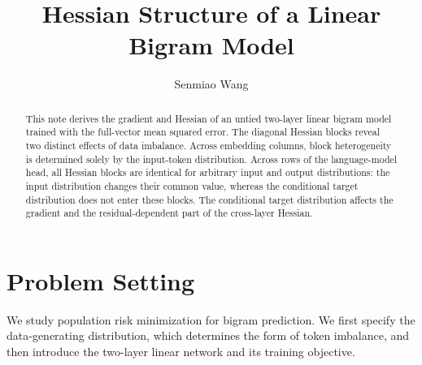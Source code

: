 \documentclass[11pt]{article}
\title{Hessian Structure of a Linear Bigram Model}
\author{Senmiao Wang}
\date{}
\begin{document}
\maketitle

\begin{abstract}
This note derives the gradient and Hessian of an untied two-layer linear
bigram model trained with the full-vector mean squared error.  The diagonal
Hessian blocks reveal two distinct effects of data imbalance.  Across
embedding columns, block heterogeneity is determined solely by the input-token
distribution.  Across rows of the language-model head, all Hessian blocks are
identical for arbitrary input and output distributions: the input distribution
changes their common value, whereas the conditional target distribution does
not enter these blocks.  The conditional target distribution affects the
gradient and the residual-dependent part of the cross-layer Hessian.
\end{abstract}

\section{Problem Setting}

We study population risk minimization for bigram prediction.  We first specify
the data-generating distribution, which determines the form of token
imbalance, and then introduce the two-layer linear network and its training
objective.
\end{document}
